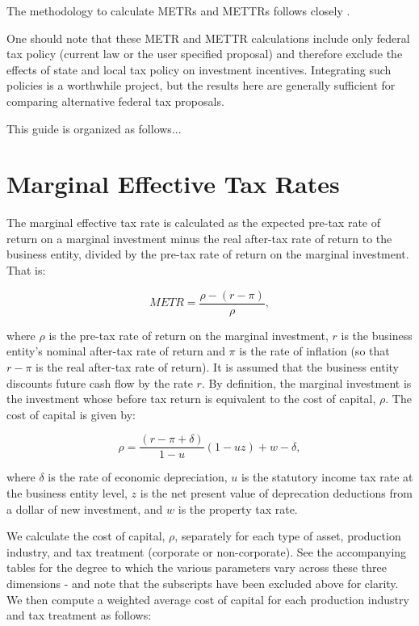 \documentclass[article,11pt,letterpaper,fleqn]{article}
\theoremstyle{definition}
\numberwithin{equation}{section}
\newcommand{\cn}{\citeasnoun} %
\begin{document}
The methodology to calculate METRs and METTRs follows closely \cn{CBO_ETRs}.

One should note that these METR and METTR calculations include only federal tax policy (current law or the user specified proposal) and therefore exclude the effects of state and local tax policy on investment incentives.  Integrating such policies is a worthwhile project, but the results here are generally sufficient for comparing alternative federal tax proposals.


This guide is organized as follows...

\section{Marginal Effective Tax Rates}

The marginal effective tax rate is calculated as the expected pre-tax rate of return on a marginal investment minus the real after-tax rate of return to the business entity, divided by the pre-tax rate of return on the marginal investment.  That is: 

\begin{equation}
METR = \frac{\rho - (r-\pi)}{\rho},
\end{equation}

\noindent\noindent where $\rho$ is the pre-tax rate of return on the marginal investment, $r$ is the business entity's nominal after-tax rate of return and $\pi$ is the rate of inflation (so that $r-\pi$ is the real after-tax rate of return).  It is assumed that the business entity discounts future cash flow by the rate $r$.  By definition, the marginal investment is the investment whose before tax return is equivalent to the cost of capital, $\rho$.  The cost of capital is given by:

\begin{equation}
\rho = \frac{(r-\pi+\delta)}{1-u}(1-uz)+w-\delta,
\end{equation}  

\noindent\noindent where $\delta$ is the rate of economic depreciation, $u$ is the statutory income tax rate at the business entity level, $z$ is the net present value of deprecation deductions from a dollar of new investment, and $w$ is the property tax rate.  

We calculate the cost of capital, $\rho$, separately for each type of asset, production industry, and tax treatment (corporate or non-corporate).  See the accompanying tables for the degree to which the various parameters vary across these three dimensions - and note that the subscripts have been excluded above for clarity.  We then compute a weighted average cost of capital for each production industry and tax treatment as follows:
\end{document}
